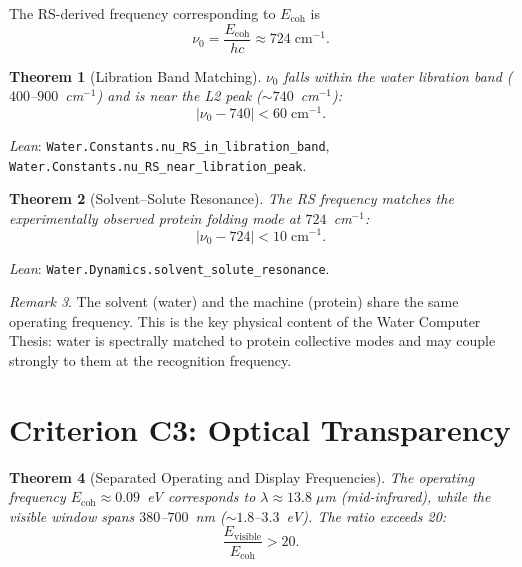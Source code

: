 \documentclass[12pt,a4paper]{article}
\newtheorem{theorem}{Theorem}[section]
\theoremstyle{definition}
\theoremstyle{remark}
\newtheorem{remark}[theorem]{Remark}
\begin{document}
The RS-derived frequency corresponding to $E_{\mathrm{coh}}$ is
\begin{equation}\label{eq:nuRS}
  \nu_0 = \frac{E_{\mathrm{coh}}}{hc} \approx 724\;\mathrm{cm}^{-1}.
\end{equation}

\begin{theorem}[Libration Band Matching]
\label{thm:freq_match}
$\nu_0$ falls within the water libration band
($400$--$900$~cm$^{-1}$) and is near the L2 peak
($\sim 740$~cm$^{-1}$):
\begin{equation}
  |\nu_0 - 740| < 60\;\mathrm{cm}^{-1}.
\end{equation}
\end{theorem}

\noindent
\textit{Lean}: \texttt{Water.Constants.nu\_RS\_in\_libration\_band},
\texttt{Water.Constants.nu\_RS\_near\_libration\_peak}.

\begin{theorem}[Solvent--Solute Resonance]
\label{thm:resonance}
The RS frequency matches the experimentally observed protein folding
mode at $724$~cm$^{-1}$:
\begin{equation}
  |\nu_0 - 724| < 10\;\mathrm{cm}^{-1}.
\end{equation}
\end{theorem}

\noindent
\textit{Lean}: \texttt{Water.Dynamics.solvent\_solute\_resonance}.

\begin{remark}
The solvent (water) and the machine (protein) share the same operating
frequency.  This is the key physical content of the Water Computer
Thesis: water is spectrally matched to protein collective modes and may
couple strongly to them at the recognition frequency.
\end{remark}

\section{Criterion C3: Optical Transparency}
\label{sec:optical}

\begin{theorem}[Separated Operating and Display Frequencies]
The operating frequency $E_{\mathrm{coh}} \approx 0.09$~eV corresponds
to $\lambda \approx 13.8\;\mu$m (mid-infrared), while the visible
window spans $380$--$700$~nm ($\sim 1.8$--$3.3$~eV).  The ratio
exceeds 20:
\begin{equation}
  \frac{E_{\mathrm{visible}}}{E_{\mathrm{coh}}} > 20.
\end{equation}
\end{theorem}
\end{document}
